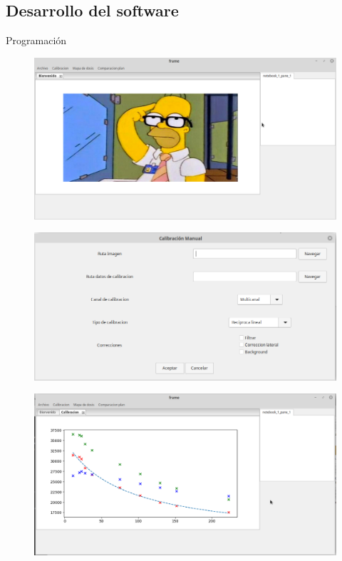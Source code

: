 \documentclass[12pt]{beamer}
\begin{document}
\subsection{Desarrollo del software}

\begin{frame}{Programación}
	\begin{figure}
		\centering
		\includegraphics[width=\linewidth]{images/programa1.png}
	\end{figure}
\end{frame}

\begin{frame}
\begin{figure}
	\centering
	\includegraphics[width=\linewidth]{images/programa2.png}
\end{figure}
\end{frame}

\begin{frame}
\begin{figure}
	\centering
	\includegraphics[width=\linewidth]{images/programa3.png}
\end{figure}
\end{frame}
\end{document}
